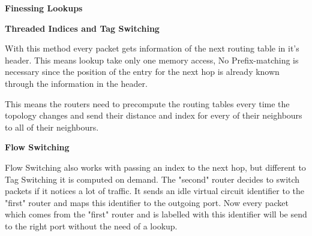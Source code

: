 \textbf{Finessing Lookups}

\textbf{Threaded Indices and Tag Switching}

With this method every packet gets information of the next routing table in it's header. This means lookup take only one memory access, No Prefix-matching is necessary since the position of the entry for the next hop is already known through the information in the header.

This means the routers need to precompute the routing tables every time the topology changes and send their distance and index for every of their neighbours to all of their neighbours.

\textbf{Flow Switching}

Flow Switching also works with passing an index to the next hop, but different to Tag Switching it is computed on demand. The "second" router decides to switch packets if it notices a lot of traffic. It sends an idle virtual circuit identifier to the "first" router and maps this identifier to the outgoing port. Now every packet which comes from the "first" router and is labelled with this identifier will be send to the right port without the need of a lookup.
